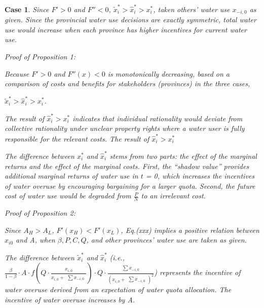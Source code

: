 \documentclass[default, sn-standardnature]{sn-jnl}
\newtheorem{case_appendix}{Case}
\begin{document}
\begin{case_appendix}
Since $F'>0$ and $F''<0$, $\widetilde x_i^*>\hat x_i^*>x_i^*$, taken others' water use $x_{-i,0}$ as given. Since the provincial water use decisions are exactly symmetric, total water use would increase when each province has higher incentives for current water use.

Proof of Proposition 1:

Because $F'>0$ and $F''(x)<0$ is monotonically decreasing, based on a comparison of costs and benefits for stakeholders (provinces) in the three cases,

$\widetilde x_i^*>\hat x_i^*>x_i^*$.

The result of $\hat x_i^*>x_i^*$ indicates that individual rationality would deviate from collective rationality under unclear property rights where a water user is fully responsible for the relevant costs. The result of $\hat x_i^*>x_i^*$

The difference between $ x_i^*$ and $\hat x_i^*$ stems from two parts: the effect of the marginal returns and the effect of the marginal costs. First, the ``shadow value'' provides additional marginal returns of water use in $t$ = 0, which increases the incentives of water overuse by encouraging bargaining for a larger quota. Second, the future cost of water use would be degraded from $\frac{P}{N}$ to an irrelevant cost.

Proof of Proposition 2:

Since $A_H>A_L$, $F'(x_H)<F'(x_L)$,
Eq.(xxx) %
implies a positive relation between $x_{i0}$ and A, when $\beta, P, C, Q$, and other provinces' water use are taken as given.

The difference between $\widetilde x_i^*$ and $\hat x_i^*$ (i.e., $\frac{\beta}{1-\beta} \cdot A \cdot f(Q \cdot \frac{x_{i,0}}{x_{i,0} + \begin{matrix} \sum x_{-i,0} \end{matrix}}) \cdot Q \cdot \frac{\begin{matrix} \sum x_{-i,0} \end{matrix}}{(x_{i,0} + \begin{matrix} \sum x_{-i,0} \end{matrix})^2}$) represents the incentive of water overuse derived from an expectation of water quota allocation. The incentive of water overuse increases by A.
\end{case_appendix}
\end{document}
